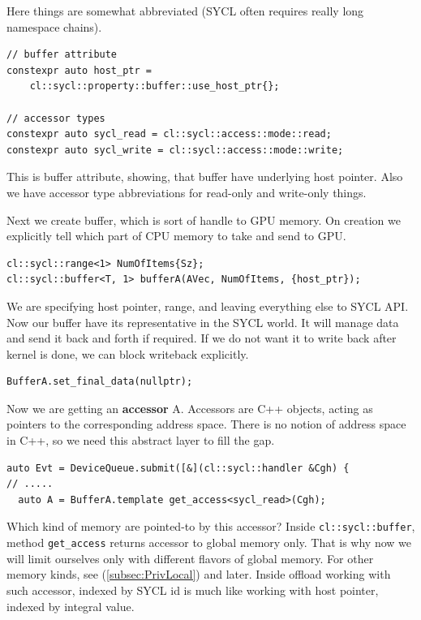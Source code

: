 \documentclass[a4paper,12pt,oneside]{article}
\begin{document}
Here things are somewhat abbreviated (SYCL often requires really long namespace chains).

\begin{lstlisting}
// buffer attribute
constexpr auto host_ptr = 
    cl::sycl::property::buffer::use_host_ptr{};

// accessor types
constexpr auto sycl_read = cl::sycl::access::mode::read;
constexpr auto sycl_write = cl::sycl::access::mode::write;
\end{lstlisting}

This is buffer attribute, showing, that buffer have underlying host pointer. Also we have accessor type abbreviations for read-only and write-only things.

Next we create buffer, which is sort of handle to GPU memory. On creation we explicitly tell which part of CPU memory to take and send to GPU.

\begin{lstlisting}
cl::sycl::range<1> NumOfItems{Sz};
cl::sycl::buffer<T, 1> bufferA(AVec, NumOfItems, {host_ptr});
\end{lstlisting}

We are specifying host pointer, range, and leaving everything else to SYCL API. Now our buffer have its representative in the SYCL world. It will manage data and send it back and forth if required. If we do not want it to write back after kernel is done, we can block writeback explicitly.

\begin{lstlisting}
BufferA.set_final_data(nullptr);
\end{lstlisting}

Now we are getting an \textbf{accessor} A. Accessors are C++ objects, acting as pointers to the corresponding address space. There is no notion of address space in C++, so we need this abstract layer to fill the gap.

\begin{lstlisting}
auto Evt = DeviceQueue.submit([&](cl::sycl::handler &Cgh) {
// .....
  auto A = BufferA.template get_access<sycl_read>(Cgh);
\end{lstlisting}

Which kind of memory are pointed-to by this accessor? Inside \lstinline!cl::sycl::buffer!, method \lstinline!get_access! returns accessor to global memory only. That is why now we will limit ourselves only with different flavors of global memory. For other memory kinds, see (\ref{subsec:PrivLocal}) and later. Inside offload working with such accessor, indexed by SYCL id is much like working with host pointer, indexed by integral value.
\end{document}
